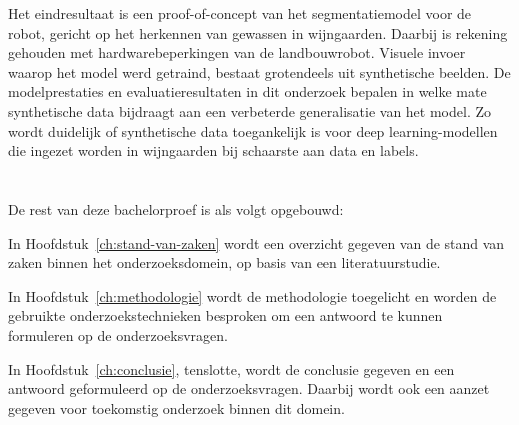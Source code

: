 Het eindresultaat is een proof-of-concept van het segmentatiemodel voor de robot, gericht op het herkennen van gewassen in wijngaarden. Daarbij is rekening gehouden met hardwarebeperkingen van de landbouwrobot. Visuele invoer waarop het model werd getraind, bestaat grotendeels uit synthetische beelden. De modelprestaties en evaluatieresultaten in dit onderzoek bepalen in welke mate synthetische data bijdraagt aan een verbeterde generalisatie van het model. Zo wordt duidelijk of synthetische data toegankelijk is voor deep learning-modellen die ingezet worden in wijngaarden bij schaarste aan data en labels.

\section{}%
\label{sec:opzet-bachelorproef}


De rest van deze bachelorproef is als volgt opgebouwd:

In Hoofdstuk~\ref{ch:stand-van-zaken} wordt een overzicht gegeven van de stand van zaken binnen het onderzoeksdomein, op basis van een literatuurstudie.

In Hoofdstuk~\ref{ch:methodologie} wordt de methodologie toegelicht en worden de gebruikte onderzoekstechnieken besproken om een antwoord te kunnen formuleren op de onderzoeksvragen.


In Hoofdstuk~\ref{ch:conclusie}, tenslotte, wordt de conclusie gegeven en een antwoord geformuleerd op de onderzoeksvragen. Daarbij wordt ook een aanzet gegeven voor toekomstig onderzoek binnen dit domein.
